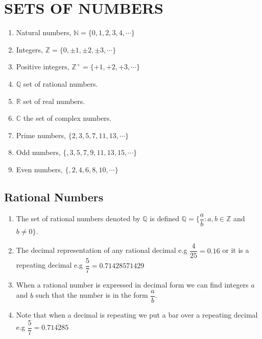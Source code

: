 \documentclass[11pt,a4paper]{article}
\begin{document}
\section{SETS OF NUMBERS}
\begin{enumerate}
\item[$\bullet$] Natural numbers, $\mathbb{N}=\{0,1,2,3,4,\cdots \}$
\item[$\bullet$] Integers, $\mathbb{Z}=\{0,\pm 1, \pm 2, \pm 3,\cdots \}$
\item[$\bullet$] Positive integers, $\mathbb{Z}^+=\{+1, +2, +3, \cdots \}$
\item[$\bullet$] $\mathbb{Q}$ set of rational numbers.
\item[$\bullet$] $\mathbb{R}$ set of real numbers.
\item[$\bullet$] $\mathbb{C}$ the set of complex numbers.
\item[$\bullet$] Prime numbers, $\{2, 3, 5, 7, 11, 13,\cdots \}$
\item[$\bullet$] Odd numbers, $\{ ,3 , 5, 7, 9, 11, 13, 15, \cdots \}$
\item[$\bullet$] Even numbers, $\{ , 2, 4, 6, 8, 10, \cdots \}$\\
\end{enumerate}




\subsection{Rational Numbers}
\begin{enumerate}
\item[$\bullet$] The set of rational numbers denoted by $\mathbb{Q}$ is defined $\mathbb{Q}=\bigg\{\dfrac{a}{b}:a,b\in \mathbb{Z}$ and $b\neq 0\bigg\}$.
\item[$\bullet$] The decimal representation of any rational decimal e.g $\dfrac{4}{25}=0.16$ or it is a repeating decimal e.g  $\dfrac{5}{7}=0.71428571429$
\item[$\bullet$] When a rational number is expressed in decimal form we can find integers $a$ and $b$ such that the number is in the form $\dfrac{a}{b}$.
\item[$\bullet$] Note that when a decimal is repeating we put a bar over a repeating decimal\\ e.g \hspace{0.2cm}$\dfrac{5}{7}=0.\overline{714285}$\\
\end{enumerate}
\end{document}
